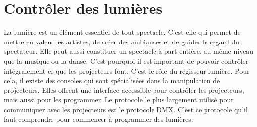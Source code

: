 \section{Contrôler des lumières}
\label{sec:controler_lumieres}

La lumière est un élément essentiel de tout spectacle. C'est elle qui permet de mettre en valeur les artistes, de créer des ambiances et de guider le regard du spectateur.
Elle peut aussi constituer un spectacle à part entière, au même niveau que la musique ou la danse.
\newline
C'est pourquoi il est important de pouvoir contrôler intégralement ce que les projecteurs font. C'est le rôle du régisseur lumière.
\newline
Pour cela, il existe des consoles qui sont spécialisées dans la manipulation de projecteurs. Elles offrent une interface accessible pour contrôler les projecteurs, mais aussi pour les programmer.
\newline
Le protocole le plus largement utilisé pour communiquer avec les projecteurs est le protocole DMX. C'est ce protocole qu'il faut comprendre pour commencer à programmer des lumières.
